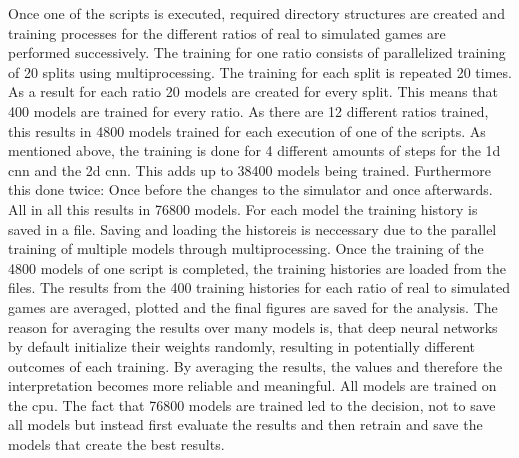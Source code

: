 Once one of the scripts is executed, required directory structures are created and training processes for the different ratios of real to simulated games are performed successively. The training for one ratio consists of parallelized training of 20 splits using multiprocessing. The training for each split is repeated 20 times. As a result for each ratio 20 models are created for every split. This means that 400 models are trained for every ratio. As there are 12 different ratios trained, this results in 4800 models trained for each execution of one of the scripts. As mentioned above, the training is done for 4 different amounts of steps for the 1d cnn and the 2d cnn. This adds up to 38400 models being trained. Furthermore this done twice: Once before the changes to the simulator and once afterwards. All in all this results in 76800 models. For each model the training history is saved in a file. Saving and loading the historeis is neccessary due to the parallel training of multiple models through multiprocessing.  Once the training of the 4800 models of one script is completed, the training histories are loaded from the files. The results from the 400 training histories for each ratio of real to simulated games are averaged, plotted and the final figures are saved for the analysis. The reason for averaging the results over many models is, that deep neural networks by default initialize their weights randomly, resulting in potentially different outcomes of each training. By averaging the results, the values and therefore the interpretation becomes more reliable and meaningful. All models are trained on the cpu. The fact that 76800 models are trained led to the decision, not to save all models but instead first evaluate the results and then retrain and save the models that create the best results. 

